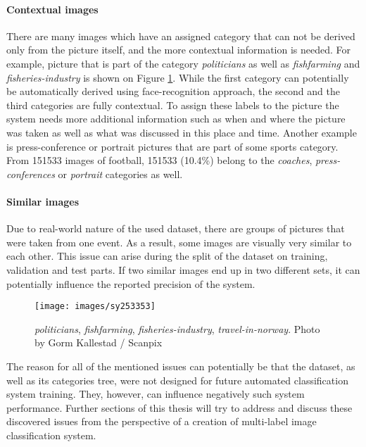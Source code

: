 \paragraph{Contextual images}
There are many images which have an assigned category that can not be derived only from the picture itself, and the more contextual information is needed. For example, picture that is part of the category \textit{politicians} as well as \textit{fishfarming} and \textit{fisheries-industry} is shown on Figure \ref{fig:politician-fish}. While the first category can potentially be automatically derived using face-recognition approach, the second and the third categories are fully contextual. To assign these labels to the picture the system needs more additional information such as when and where the picture was taken as well as what was discussed in this place and time. Another example is press-conference or portrait pictures that are part of some sports category. From 151533 images of football, 151533 (10.4\%) belong to the \textit{coaches}, \textit{press-conferences} or \textit{portrait} categories as well.

\paragraph{Similar images}
Due to real-world nature of the used dataset, there are groups of pictures that were taken from one event. As a result, some images are visually very similar to each other. This issue can arise during the split of the dataset on training, validation and test parts. If two similar images end up in two different sets, it can potentially influence the reported precision of the system.

\begin{figure}[h]
    \centering
    \texttt{[image: images/sy253353]}
    \caption[Example of contextual image]{\textit{politicians}, \textit{fishfarming}, \textit{fisheries-industry}, \textit{travel-in-norway}. Photo by Gorm Kallestad / Scanpix}
    \label{fig:politician-fish}
\end{figure}

The reason for all of the mentioned issues can potentially be that the dataset, as well as its categories tree, were not designed for future automated classification system training. They, however, can influence negatively such system performance. Further sections of this thesis will try to address and discuss these discovered issues from the perspective of a creation of multi-label image classification system.

